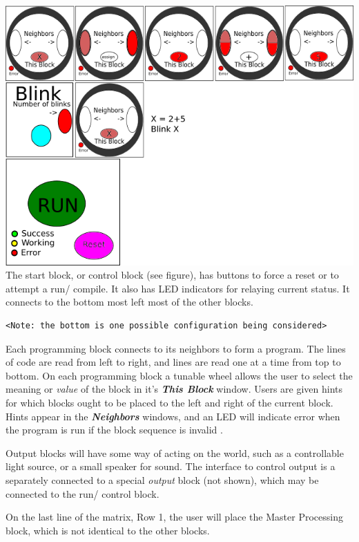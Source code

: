 \includegraphics[width=6in]{user_interface}
\vspace{.5cm}\\
The  start block, or control block (see figure), has buttons to  force a reset or to attempt a run/ compile.  It also has LED indicators for relaying current status. It connects to the bottom most left most of the other blocks. \begin{verbatim}
<Note: the bottom is one possible configuration being considered> 
\end{verbatim}

Each programming block connects to its neighbors to form a program. The lines of  code are read from left to right, and lines are read one at a time from top to bottom. On each programming block a tunable wheel allows the user to select the meaning or \textit{value} of the block  in it's \textbf{\textit{This Block}} window.  Users are given hints for which blocks ought to be placed to the left and right of the current block. Hints appear in the \textbf{\textit{Neighbors}} windows, and an LED will indicate error when the program is run if the block sequence is invalid . 

Output blocks will have some way of acting on the world, such as a controllable light source, or a small speaker for sound. The interface to control  output is a separately connected to a special \textit{output} block (not shown), which may be connected to the run/ control block.


   
    On the last line of the matrix, Row 1, the user will place the Master Processing block, which is not identical to the other blocks.
